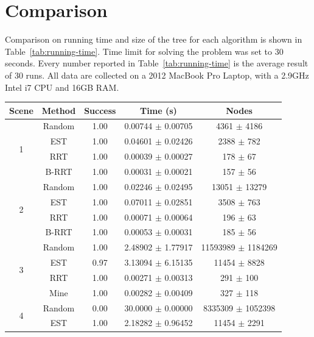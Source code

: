 \documentclass[11pt, oneside]{article}   	%
\begin{document}
\section{Comparison}
Comparison on running time and size of the tree for each algorithm is shown in Table~\ref{tab:running-time}. 
Time limit for solving the problem was set to 30 seconds. 
Every number reported in Table~\ref{tab:running-time} is the average result of 30 runs.
All data are collected on a 2012 MacBook Pro Laptop, with a 2.9GHz Intel i7 CPU and 16GB RAM.

\begin{table}
\begin{center}
    \begin{tabular}{ | c | c | c | c | c |}
    \hline
    Scene 					& Method 	& Success 	& Time (s)						& Nodes 						\\ \hline
    \multirow{4}{*}{1}		& Random 	& 1.00 		& 0.00744 $\pm$	0.00705			& 4361		$\pm$	4186		\\ 
    						& EST		& 1.00		& 0.04601 $\pm$ 0.02426 		& 2388 		$\pm$	782 		\\ 
							& RRT 		& 1.00 		& 0.00039 $\pm$	0.00027 		& 178 		$\pm$	67	 		\\ 
 							& B-RRT		& 1.00		& 0.00031 $\pm$	0.00021  		& 157 		$\pm$	56	 		\\ \hline
    \multirow{4}{*}{2}		& Random 	& 1.00 		& 0.02246 $\pm$	0.02495 		& 13051 	$\pm$	13279	 	\\ 
    						& EST		& 1.00		& 0.07011 $\pm$	0.02851  		& 3508 		$\pm$	763		  	\\ 
							& RRT 		& 1.00 		& 0.00071 $\pm$	0.00064  		& 196 		$\pm$	63	  		\\ 
 							& B-RRT		& 1.00		& 0.00053 $\pm$	0.00031  		& 185 		$\pm$	56	  		\\ \hline
	\multirow{4}{*}{3}		& Random 	& 1.00 		& 2.48902 $\pm$	1.77917  		& 11593989	$\pm$ 	1184269 	\\ 
    						& EST		& 0.97		& 3.13094 $\pm$	6.15135   		& 11454 	$\pm$	8828	   	\\ 
							& RRT 		& 1.00 		& 0.00271 $\pm$	0.00313   		& 291 		$\pm$	100		   	\\ 
 							& Mine		& 1.00		& 0.00282 $\pm$	0.00409   		& 327 		$\pm$	118	   		\\ \hline
	\multirow{4}{*}{4}		& Random 	& 0.00 		& 30.0000 $\pm$	0.00000   		& 8335309 	$\pm$	1052398	 	\\ 
    						& EST		& 1.00		& 2.18282 $\pm$	0.96452    		& 11454 	$\pm$	2291    	\\ 

\end{tabular}
\end{center}
\end{table}
\end{document}
